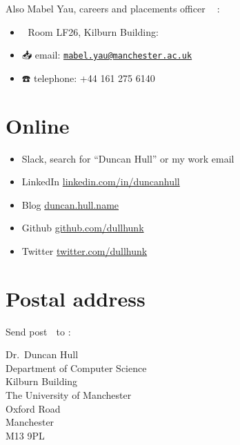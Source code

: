 \documentclass[12pt,]{book}
\providecommand{\tightlist}{%
  \setlength{\itemsep}{0pt}\setlength{\parskip}{0pt}}
\begin{document}
Also Mabel Yau, careers and placements officer 👩‍💻 :

\begin{itemize}
\tightlist
\item
  🏢 Room LF26, Kilburn Building:
\item
  📥 email: \href{mailto:mabel.yau@manchester.ac.uk}{\nolinkurl{mabel.yau@manchester.ac.uk}}
\item
  ☎️ telephone: +44 161 275 6140
\end{itemize}

\hypertarget{online}{%
\section{Online}\label{online}}

\begin{itemize}
\tightlist
\item
  Slack, search for ``Duncan Hull'' or my work email
\item
  LinkedIn \href{https://uk.linkedin.com/in/duncanhull}{linkedin.com/in/duncanhull}
\item
  Blog \href{https://duncan.hull.name}{duncan.hull.name}
\item
  Github \href{https://github.com/dullhunk}{github.com/dullhunk}
\item
  Twitter \href{https://twitter.com/dullhunk}{twitter.com/dullhunk}
\end{itemize}

\hypertarget{postal-address}{%
\section{Postal address}\label{postal-address}}

Send post 🐌 to :

Dr.~Duncan Hull\\
Department of Computer Science\\
Kilburn Building\\
The University of Manchester\\
Oxford Road\\
Manchester\\
M13 9PL


\end{document}
